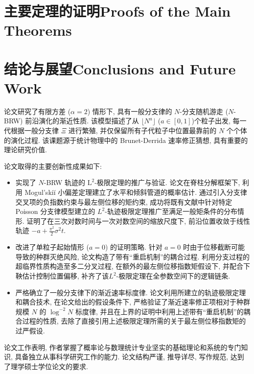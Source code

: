 \documentclass[type=master]{fduthesis}
\makeatletter
\def\bilingual@checkspace{%
  \futurelet\bilingual@nexttoken\bilingual@checkspace@i}
\def\bilingual@checkspace@i{%
  \ifx\bilingual@nexttoken\@sptoken
    \let\bilingual@nextaction\bilingual@eatspace
  \else
    \let\bilingual@nextaction\relax
  \fi
  \bilingual@nextaction}
\DeclareRobustCommand{\bilingual}[2]{%
  \ifchinese
    \tl_trim_spaces:n {#2}\relax
  \else
    \tl_trim_spaces:n {#1}\relax
  \fi
  \bilingual@checkspace}
\def\bilingual#1#2{\ifchinese #2\else #1\fi}%
\newtheorem[
  sibling={},
  header-font=\normalfont\bilingual{\bfseries\upshape}{\sffamily}, 
  body-font=\normalfont\mdseries\bilingual{\itshape}{\upshape},
  head-format={\NAME\,\NUMBER\NOTE},
  note-brace-left={\mdseries\upshape(},
  note-brace-right={\mdseries\upshape)},
]{assumption}{\bilingual{Assumption}{假设}}
\makeatother
\begin{document}
\chapter{\bilingual{Proofs of the Main Theorems}{主要定理的证明}}


\raggedbottom

\chapter{\bilingual{Conclusions and Future Work}{结论与展望}}



\appendix


\backmatter


\bilingual{
    \linespread{1.2}
}{
    \linespread{1.2}
}

\printbibliography
\renewcommand{\bibname}{参考文献}

\ifcolor
    \newpage
    论文研究了有限方差 ($\alpha=2$) 情形下, 具有一般分支律的 $N$-分支随机游走 ($N$-BRW) 前沿演化的渐近性质. 该模型描述了从 $\lfloor N^a\rfloor$ ($a\in[0,1]$)个粒子出发, 每一代根据一般分支律 $\Xi$ 进行繁殖, 并仅保留所有子代粒子中位置最靠前的 $N$ 个个体的演化过程. 该课题源于统计物理中的 Brunet-Derrida 速率修正猜想, 具有重要的理论研究价值. 

    论文取得的主要创新性成果如下:
    \begin{itemize}
        \item 实现了 $N$-BRW 轨迹的 $\mathrm L^2$-极限定理的推广与验证. 论文在脊柱分解框架下, 利用 Mogul'skiĭ 小偏差定理建立了水平和倾斜管道的概率估计. 通过引入分支律交叉项的负指数约束与最左侧位移的矩约束, 成功将既有文献中针对特定 Poisson 分支律模型建立的 $L^2$-轨迹极限定理推广至满足一般矩条件的分布情形. 证明了在三次对数时间与一次对数空间的缩放尺度下, 前沿位置收敛于线性轨迹 $-a+\frac{\pi^2}2\sigma^2t$.
        \item 改进了单粒子起始情形 ($a=0$) 的证明策略.  针对 $a=0$ 时由于位移截断可能导致的种群灭绝风险, 论文构造了带有``重启机制''的耦合过程. 利用分支过程的超临界性质构造至多二分叉过程, 在额外的最左侧位移指数矩假设下, 并配合下鞅估计控制位置偏移, 补齐了该$L^2$-极限定理在全参数空间下的逻辑链条. 
        \item 严格确立了一般分支律下的渐近速率标度律.  论文利用所建立的轨迹极限定理和耦合技术, 在论文给出的假设条件下, 严格验证了渐近速率修正项相对于种群规模 $N$ 的 $\log^{-2}N$ 标度律, 并且在上界的证明中利用上述带有``重启机制''的耦合过程的性质, 去除了直接引用上述极限定理所需的关于最左侧位移指数矩的过严假设.
    \end{itemize}
    论文工作表明, 作者掌握了概率论与数理统计专业坚实的基础理论和系统的专门知识, 具备独立从事科学研究工作的能力. 论文结构严谨, 推导详尽, 写作规范, 达到了理学硕士学位论文的要求. 
\end{document}
